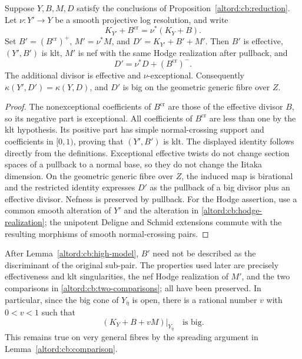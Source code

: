 \begin{lemma}
\label{altord:cb:high-model}
Suppose \(Y,B,M,D\) satisfy the conclusions of
Proposition~\ref{altord:cb:reduction}.  Let \(\nu:Y'\to Y\) be a smooth
projective log resolution, and write
\[
 K_{Y'}+B^{\mathrm{cr}}=\nu^*(K_Y+B).
\]
Set \(B'=(B^{\mathrm{cr}})^+\), \(M'=\nu^*M\), and
\(D'=K_{Y'}+B'+M'\).
Then \(B'\) is effective, \((Y',B')\) is klt, \(M'\) is nef with
the same Hodge realization after pullback, and
\[
 D'=\nu^*D+(B^{\mathrm{cr}})^-.
\]
The additional divisor is effective and \(\nu\)-exceptional.
Consequently \(\kappa(Y',D')=\kappa(Y,D)\), and \(D'\) is big
on the geometric generic fibre over \(Z\).
\end{lemma}

\begin{proof}
The nonexceptional coefficients of \(B^{\mathrm{cr}}\) are those
of the effective divisor \(B\), so its negative part is
exceptional.  All coefficients of \(B^{\mathrm{cr}}\) are less
than one by the klt hypothesis.  Its positive part has simple
normal-crossing support and coefficients in \([0,1)\), proving
that \((Y',B')\) is klt.
The displayed identity follows directly from the definitions.
Exceptional effective twists do not change section spaces of a
pullback to a normal base, so they do not change the Iitaka
dimension.
On the geometric generic fibre over \(Z\), the induced map is
birational and the restricted identity expresses \(D'\) as the
pullback of a big divisor plus an effective divisor.
Nefness is preserved by pullback.  For the Hodge assertion, use
a common smooth alteration of \(Y'\) and the alteration in
\eqref{altord:cb:hodge-realization}; the unipotent Deligne and Schmid
extensions commute with the resulting morphisms of smooth
normal-crossing pairs.
\end{proof}

\begin{remark}\label{altord:cb:reduced-moduli-remark}
After Lemma~\ref{altord:cb:high-model}, \(B'\) need not be described as
the discriminant of the original sub-pair.  The properties used
later are precisely effectiveness and klt singularities, the
nef Hodge realization of \(M'\), and the two comparisons in
\eqref{altord:cb:two-comparisons}; all have been preserved.
In particular, since the big cone of \(Y_{\bar\eta}\) is open,
there is a rational number \(v\) with \(0<v<1\) such that
\[
 (K_Y+B+vM)|_{Y_{\bar\eta}}
 \quad\text{is big}.
\]
This remains true on very general fibres by the spreading
argument in Lemma~\ref{altord:cb:comparison}.
\end{remark}
